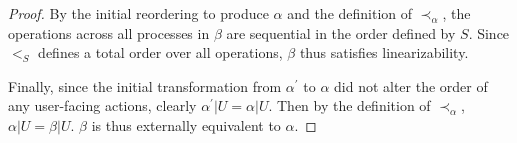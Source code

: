 \begin{proof}
By the initial reordering to produce $\alpha$ and the definition of
$\prec_{\alpha}$, the operations across all processes in $\beta$
are sequential in the order defined by $S$. Since $<_S$ defines a
total order over all operations, $\beta$ thus satisfies linearizability.

Finally, since the initial transformation from $\alpha^\prime$ to $\alpha$
did not alter the order of any user-facing actions, clearly
$\alpha^\prime | U = \alpha | U$. Then by the definition of $\prec_{\alpha}$, 
$\alpha | U = \beta | U$. $\beta$ is thus externally equivalent to $\alpha$.
\end{proof}
